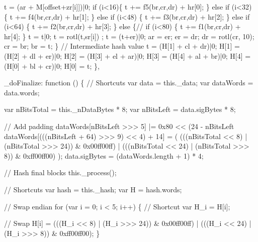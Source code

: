 \begin{DoxyCodeInclude}
                t = (ar + M[offset+zr[i]])|0;
                \textcolor{keywordflow}{if} (i<16)\{
                t +=  f5(br,cr,dr) + hr[0];
                \} \textcolor{keywordflow}{else} \textcolor{keywordflow}{if} (i<32) \{
                t +=  f4(br,cr,dr) + hr[1];
                \} \textcolor{keywordflow}{else} \textcolor{keywordflow}{if} (i<48) \{
                t +=  f3(br,cr,dr) + hr[2];
                \} \textcolor{keywordflow}{else} \textcolor{keywordflow}{if} (i<64) \{
                t +=  f2(br,cr,dr) + hr[3];
                \} \textcolor{keywordflow}{else} \{\textcolor{comment}{// if (i<80) \{}
                t +=  f1(br,cr,dr) + hr[4];
                \}
                t = t|0;
                t =  rotl(t,sr[i]) ;
                t = (t+er)|0;
                ar = er;
                er = dr;
                dr = rotl(cr, 10);
                cr = br;
                br = t;
            \}
            \textcolor{comment}{// Intermediate hash value}
            t    = (H[1] + cl + dr)|0;
            H[1] = (H[2] + dl + er)|0;
            H[2] = (H[3] + el + ar)|0;
            H[3] = (H[4] + al + br)|0;
            H[4] = (H[0] + bl + cr)|0;
            H[0] =  t;
        \},

        \_doFinalize: \textcolor{keyword}{function} () \{
            \textcolor{comment}{// Shortcuts}
            var data = this.\_data;
            var dataWords = data.words;

            var nBitsTotal = this.\_nDataBytes * 8;
            var nBitsLeft = data.sigBytes * 8;

            \textcolor{comment}{// Add padding}
            dataWords[nBitsLeft >>> 5] |= 0x80 << (24 - nBitsLeft %
            dataWords[(((nBitsLeft + 64) >>> 9) << 4) + 14] = (
                (((nBitsTotal << 8)  | (nBitsTotal >>> 24)) & 0x00ff00ff) |
                (((nBitsTotal << 24) | (nBitsTotal >>> 8))  & 0xff00ff00)
            );
            data.sigBytes = (dataWords.length + 1) * 4;

            \textcolor{comment}{// Hash final blocks}
            this.\_process();

            \textcolor{comment}{// Shortcuts}
            var hash = this.\_hash;
            var H = hash.words;

            \textcolor{comment}{// Swap endian}
            \textcolor{keywordflow}{for} (var i = 0; i < 5; i++) \{
                \textcolor{comment}{// Shortcut}
                var H\_i = H[i];

                \textcolor{comment}{// Swap}
                H[i] = (((H\_i << 8)  | (H\_i >>> 24)) & 0x00ff00ff) |
                       (((H\_i << 24) | (H\_i >>> 8))  & 0xff00ff00);
            \}


\end{DoxyCodeInclude}
